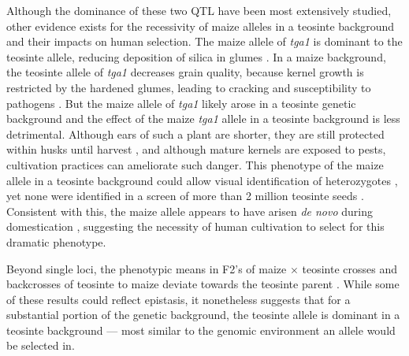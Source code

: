 \documentclass[9pt,twocolumn,twoside]{rilabRxiv}
\newcommand{\jri}[1]{{\small \textcolor{red}{#1}}}
\begin{document}
﻿Although the dominance of these two QTL have been most extensively studied, other evidence exists for the recessivity of maize alleles in a teosinte background and their impacts on human selection.
The maize allele of \textit{tga1} is dominant to the teosinte allele, reducing deposition of silica in glumes \citep{dorweiler1997}.
In a maize background, the teosinte allele of \textit{tga1} decreases grain quality, because kernel growth is restricted by the hardened glumes, leading to cracking and susceptibility to pathogens \citep{dorweiler1993}.
But the maize allele of \textit{tga1} likely arose in a teosinte genetic background and the effect of the maize \textit{tga1} allele in a teosinte background is less detrimental.
Although ears of such a plant are shorter, they are still protected within husks until harvest \citep{dorweiler1993},  and although mature kernels are exposed to pests, cultivation practices can ameliorate such danger.
This phenotype of the maize allele in a teosinte background could allow visual identification of heterozygotes \citep{wang2005}, yet none were identified in a screen of more than 2 million teosinte seeds \citep{beadle1980, wilkes2004, bergsingerbook}.
Consistent with this, the maize allele appears to have arisen \textit{de novo} during domestication  \citep{wang2015}, suggesting  the necessity of human cultivation to select for this dramatic phenotype.

﻿Beyond single loci, the phenotypic means in F2's of maize $\times$ teosinte crosses and backcrosses of teosinte to maize deviate towards the teosinte parent \citep{lambert1965, doebley1990, doebley1993,  doebley1995}.
While some of these results could reflect epistasis, it nonetheless suggests that for a substantial portion of the genetic background, the teosinte allele is dominant in a teosinte background --- most similar to the genomic environment an allele would be selected in.  %
\end{document}
